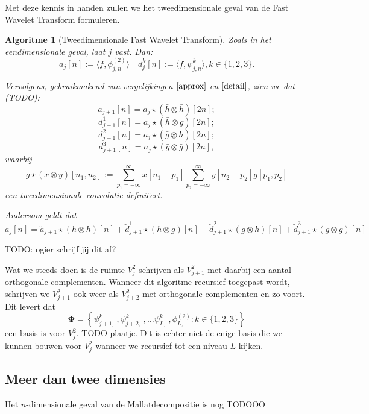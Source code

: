 \documentclass[11pt]{report}
\theoremstyle{plain}
\newtheorem*{algo}{Algoritme}
\theoremstyle{remark}
\begin{document}
Met deze kennis in handen zullen we het tweedimensionale geval van de Fast Wavelet Transform formuleren.
\begin{algo}[Tweedimensionale Fast Wavelet Transform]
Zoals in het eendimensionale geval, laat $j$ vast. Dan:
\[
	a_j[n] := \langle f, \phi^{(2)}_{j,n} \rangle \quad d^k_j[n] := \langle f, \psi^k_{j,n} \rangle , k \in \{1,2,3\}.
\]

Vervolgens, gebruikmakend van vergelijkingen $\ref{approx}$ en $\ref{detail}$, zien we dat (TODO):
\[
	a_{j+1}[n] = a_j \star (\bar{h} \otimes \bar{h})[2n];
\]
\[
	d^1_{j+1}[n] = a_j \star (\bar{h} \otimes \bar{g})[2n];
\]
\[
	d^2_{j+1}[n] = a_j \star (\bar{g} \otimes \bar{h})[2n];
\]
\[
	d^3_{j+1}[n] = a_j \star (\bar{g} \otimes \bar{g})[2n],
\]
waarbij
\[
	g \star (x \otimes y)[n_1,n_2] := \sum_{p_1=-\infty}^\infty x[n_1 - p_1] \sum_{p_2 = -\infty}^\infty y[n_2 - p_2] g[p_1, p_2]
\]
een tweedimensionale convolutie defini\"eert.

Andersom geldt dat
\[
a_j[n] = \breve{a}_{j+1} \star (h \otimes h)[n] + \breve{d}_{j+1}^1 \star (h \otimes g)[n] + \breve{d}_{j+1}^2 \star (g \otimes h)[n] + \breve{d}_{j+1}^3 \star (g \otimes g)[n]
\]
\end{algo}

TODO: ogier schrijf jij dit af?

Wat we steeds doen is de ruimte $V_j^2$ schrijven als $V_{j+1}^2$ met daarbij een aantal orthogonale complementen. Wanneer dit algoritme recursief toegepast wordt, schrijven we $V_{j+1}^2$ ook weer als $V_{j+2}^2$ met orthogonale complementen en zo voort. Dit levert dat
\[
	\boldsymbol\Phi = \left\{ \psi^k_{j+1,\cdot}, \psi^k_{j+2,\cdot}, \ldots \psi^k_{L,\cdot}, \phi^{(2)}_{L,\cdot}: k \in \{1,2,3\} \right\}
\]
een basis is voor $V_j^2$. TODO plaatje. Dit is echter niet de enige basis die we kunnen bouwen voor $V_j^2$ wanneer we recursief tot een niveau $L$ kijken.

\subsection{Meer dan twee dimensies}
Het $n$-dimensionale geval van de Mallatdecompositie is nog TODOOO
\end{document}
